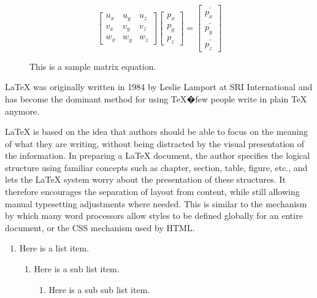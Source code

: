 \documentclass[12pt]{ucthesis}
\newcommand{\captionfonts}{\small\bf\ssp}
\begin{document}





\begin{figure}
\begin{center}
\[
\left[\begin{array}{ccc}
u_{x} & u_{y} & u_{z}\\
v_{x} & v_{y} & v_{z}\\
w_{x} & w_{y} & w_{z}\end{array}\right]\left[\begin{array}{c}
p_{x}\\
p_{y}\\
p_{z}\end{array}\right]=\left[\begin{array}{c}
p_{x}^{\prime}\\
p_{y}^{\prime}\\
p_{z}^{\prime}\end{array}\right]\]
\captionfonts
\caption[A matrix equation]{This is a sample matrix equation.}
\label{eqn:example}
\end{center}
\end{figure}


LaTeX was originally written in 1984 by Leslie Lamport at SRI International and has become the dominant method for using TeX�few people write in plain TeX anymore.

LaTeX is based on the idea that authors should be able to focus on the meaning of what they are writing, without being distracted by the visual presentation of the information. In preparing a LaTeX document, the author specifies the logical structure using familiar concepts such as chapter, section, table, figure, etc., and lets the LaTeX system worry about the presentation of these structures. It therefore encourages the separation of layout from content, while still allowing manual typesetting adjustments where needed. This is similar to the mechanism by which many word processors allow styles to be defined globally for an entire document, or the CSS mechanism used by HTML.


\begin{enumerate}
\item Here is a list item.
\begin{enumerate}
\item Here is a sub list item.
\begin{enumerate}
\item Here is a sub sub list item.

\end{enumerate}
\end{enumerate}
\end{enumerate}
\end{document}
